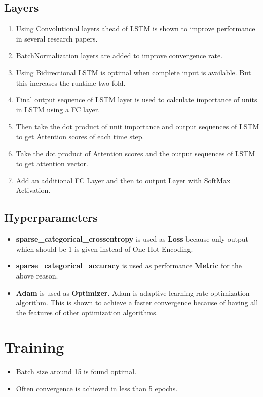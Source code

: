 \documentclass[11pt,english]{article}
\begin{document}
\subsection{Layers}
\begin{enumerate}
    \item Using Convolutional layers ahead of LSTM is shown to improve performance in several research papers.
    \item BatchNormalization layers are added to improve convergence rate.
    \item Using Bidirectional LSTM is optimal when complete input is available. But this increases the runtime two-fold.
    \item Final output sequence of LSTM layer is used to calculate importance of units in LSTM using a FC layer.
    \item Then take the dot product of unit importance and output sequences of LSTM to get Attention scores of each time step.
    \item Take the dot product of Attention scores and the output sequences of LSTM to get attention vector.
    \item Add an additional FC Layer and then to output Layer with SoftMax Activation.
\end{enumerate}

\subsection{Hyperparameters}
\begin{itemize}
    \item \textbf{sparse\_categorical\_crossentropy} is used as \textbf{Loss} because only output which should be 1 is given instead of One Hot Encoding.
    \item \textbf{sparse\_categorical\_accuracy} is used as performance \textbf{Metric} for the above reason.
    \item \textbf{Adam} is used as \textbf{Optimizer}. Adam is adaptive learning rate optimization algorithm. This is shown to achieve a faster convergence because of having all the features of other optimization algorithms.
\end{itemize}

\section{Training}
\begin{itemize}
    \item Batch size around 15 is found optimal.
    \item Often convergence is achieved in less than 5 epochs.
\end{itemize}
\end{document}
